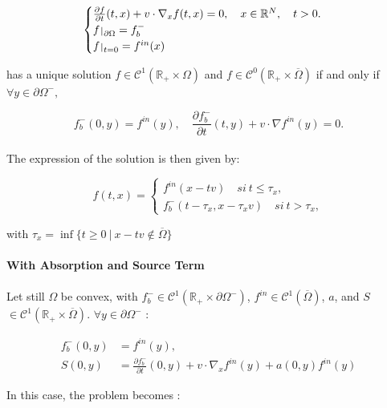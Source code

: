 \documentclass[a4paper, 11pt]{article}
\def\restriction#1#2{\mathchoice
	{\setbox1\hbox{${\displaystyle #1}_{\scriptstyle #2}$}
		\restrictionaux{#1}{#2}}
	{\setbox1\hbox{${\textstyle #1}_{\scriptstyle #2}$}
		\restrictionaux{#1}{#2}}
	{\setbox1\hbox{${\scriptstyle #1}_{\scriptscriptstyle #2}$}
		\restrictionaux{#1}{#2}}
	{\setbox1\hbox{${\scriptscriptstyle #1}_{\scriptscriptstyle #2}$}
		\restrictionaux{#1}{#2}}}
\def\restrictionaux#1#2{{#1\,\smash{\vrule height .8\ht1 depth .85\dp1}}_{\,#2}}
\begin{document}
\[
\begin{cases}
\frac{\partial f}{\partial t}(t,x)+v \cdot \nabla_x f(t,x)=0, \quad x \in \mathbb{R}^N, \quad t>0.\\
\restriction{f}{\partial \Omega}= f_b^-\\
\restriction{f}{t=0}= f^{in}(x)
\end{cases}
\]

has a unique solution $f \in \mathcal{C}^1(\mathbb{R}_+ \times \Omega)$ and $f \in \mathcal{C}^0(\mathbb{R}_+ \times \overline{\Omega})$ if and only if $\forall y \in \partial \Omega^-,$

\[ f_b^-(0,y) = f^{in}(y), \quad \frac{\partial f_b^-}{\partial t}(t,y)+v \cdot \nabla f^{in}(y)=0. \]

\paragraph{}

The expression of the solution is then given by: 

\[
f(t,x)= 
\begin{cases}
f^{in}(x-tv) \quad si~ t \leq \tau_x ,\\
f_b^-(t-\tau_x,x-\tau_xv) \quad si~ t > \tau_x ,
\end{cases}
\]

with $\tau_x= \inf \{t \geq 0~ | ~ x-tv \notin \overline{\Omega}\}$

\paragraph{With Absorption and Source Term}

\paragraph{}
Let still $\Omega$ be convex, with $f_b^- \in \mathcal{C}^1(\mathbb{R}_+ \times \partial \Omega^-)$, $f^{in} \in \mathcal{C}^1(\overline{\Omega})$, $a$, and $S$ $\in \mathcal{C}^1(\mathbb{R}_+ \times \overline{\Omega})$. 
\medbreak
$\forall y \in \partial \Omega^-$ :

\[
\begin{aligned}
f_b^-(0,y) &= f^{in}(y), \\
S(0,y) &= \frac{\partial f_b^-}{\partial t}(0,y) + v \cdot \nabla_x f^{in}(y) + a(0,y)f^{in}(y)
\end{aligned}
\]



In this case, the problem becomes :
\end{document}

